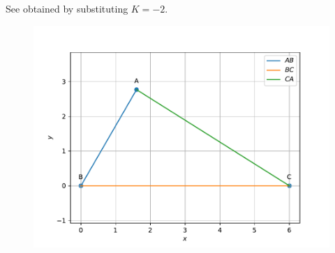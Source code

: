 See 
		 obtained by substituting $K = -2$. 
	\begin{figure}[!h]
		\centering
 \includegraphics[width=\columnwidth]{chapters/9/11/2/3/figs/vector.pdf}
		\caption{}
		\label{fig:9/11/2/3}
  	\end{figure}
